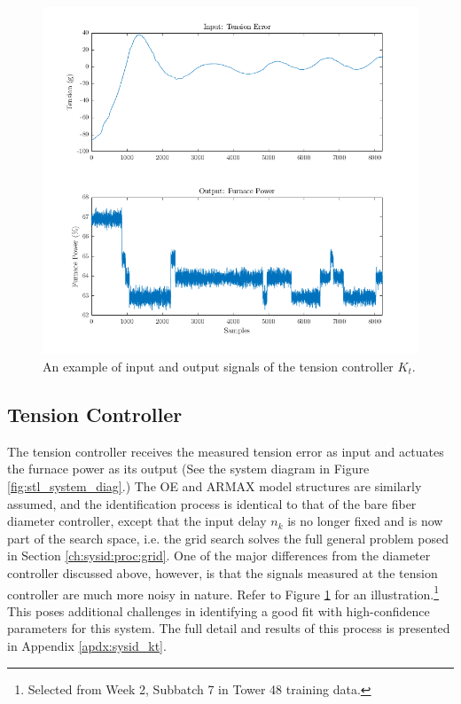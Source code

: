 \begin{figure}[h!]
    \centering
    \includegraphics[width=\textwidth]{figures/kt_example2.png}
    \caption{An example of input and output signals of the tension controller $K_t$.}
    \label{fig:kt_example}
\end{figure}

\subsection*{Tension Controller}

The tension controller receives the measured tension error as input and actuates the furnace power as its output (See the system diagram in Figure \ref{fig:stl_system_diag}.) The OE and ARMAX model structures are similarly assumed, and the identification process is identical to that of the bare fiber diameter controller, except that the input delay $n_k$ is no longer fixed and is now part of the search space, i.e. the grid search solves the full general problem posed in Section \ref{ch:sysid:proc:grid}. One of the major differences from the diameter controller discussed above, however, is that the signals measured at the tension controller are much more noisy in nature. Refer to Figure \ref{fig:kt_example} for an illustration.\footnote{Selected from Week 2, Subbatch 7 in Tower 48 training data.} This poses additional challenges in identifying a good fit with high-confidence parameters for this system. The full detail and results of this process is presented in Appendix \ref{apdx:sysid_kt}. 


